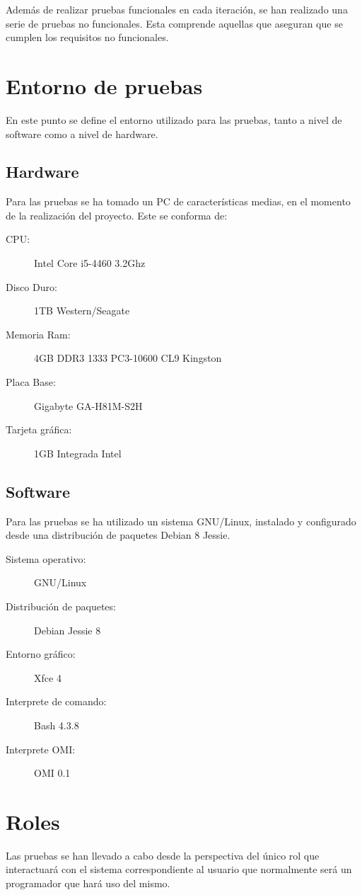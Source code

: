 Además de realizar pruebas funcionales en cada iteración, se han realizado una serie de pruebas no funcionales. 
Esta comprende aquellas que aseguran que se cumplen los requisitos no funcionales.

\section{Entorno de pruebas}
En este punto se define el entorno utilizado para las pruebas, tanto a nivel de software como a nivel de hardware. 

\subsection{Hardware}
Para las pruebas se ha tomado un PC de características medias, en el momento de la realización del proyecto. Este se conforma de:

\begin{description}
\item [CPU:]  Intel Core i5-4460 3.2Ghz 
\item [Disco Duro:] 1TB Western/Seagate
\item [Memoria Ram:] 4GB DDR3 1333 PC3-10600 CL9 Kingston
\item [Placa Base:] Gigabyte GA-H81M-S2H   
\item [Tarjeta gráfica:] 1GB Integrada Intel 
\end {description}

\subsection{Software}
Para las pruebas se ha utilizado un sistema GNU/Linux, instalado y configurado desde una distribución de paquetes 
Debian 8 Jessie. 

\begin{description}
\item [Sistema operativo:] GNU/Linux 
\item [Distribución de paquetes:] Debian Jessie 8
\item [Entorno gráfico:] Xfce 4
\item [Interprete de comando:] Bash 4.3.8
\item [Interprete OMI:] OMI 0.1
\end{description}

\section{Roles}
Las pruebas se han llevado a cabo desde la perspectiva del único rol que interactuará con el sistema correspondiente al usuario que 
normalmente será un programador que hará uso del mismo.

